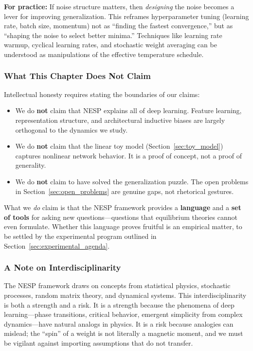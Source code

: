 \documentclass[
  journal=largetwo,
  year=2025,
  volume=37,
]{cup-journal}
\begin{document}
\textbf{For practice:} If noise structure matters, then \textit{designing} the noise becomes a lever for improving generalization. This reframes hyperparameter tuning (learning rate, batch size, momentum) not as ``finding the fastest convergence,'' but as ``shaping the noise to select better minima.'' Techniques like learning rate warmup, cyclical learning rates, and stochastic weight averaging can be understood as manipulations of the effective temperature schedule.

\subsubsection{What This Chapter Does Not Claim}

Intellectual honesty requires stating the boundaries of our claims:
\begin{itemize}
    \item We do \textbf{not} claim that NESP explains all of deep learning. Feature learning, representation structure, and architectural inductive biases are largely orthogonal to the dynamics we study.
    \item We do \textbf{not} claim that the linear toy model (Section~\ref{sec:toy_model}) captures nonlinear network behavior. It is a proof of concept, not a proof of generality.
    \item We do \textbf{not} claim to have solved the generalization puzzle. The open problems in Section~\ref{sec:open_problems} are genuine gaps, not rhetorical gestures.
\end{itemize}

What we \textit{do} claim is that the NESP framework provides a \textbf{language} and a \textbf{set of tools} for asking new questions---questions that equilibrium theories cannot even formulate. Whether this language proves fruitful is an empirical matter, to be settled by the experimental program outlined in Section~\ref{sec:experimental_agenda}.

\subsubsection{A Note on Interdisciplinarity}

The NESP framework draws on concepts from statistical physics, stochastic processes, random matrix theory, and dynamical systems. This interdisciplinarity is both a strength and a risk. It is a strength because the phenomena of deep learning---phase transitions, critical behavior, emergent simplicity from complex dynamics---have natural analogs in physics. It is a risk because analogies can mislead; the ``spin'' of a weight is not literally a magnetic moment, and we must be vigilant against importing assumptions that do not transfer.
\end{document}
